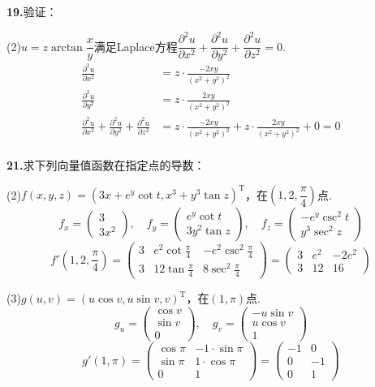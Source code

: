 \documentclass[12pt, a4paper]{article}
\begin{document}
\textbf{19.}验证：

(2)\(u = z\arctan \dfrac{x}{y}\)满足Laplace方程\(\dfrac{\partial^2 u}{\partial x^2} + \dfrac{\partial^2 u}{\partial y^2} + \dfrac{\partial^2 u}{\partial z^2} = 0\).
\begin{align*}
\frac{\partial^2 u}{\partial x^2} &= z \cdot \frac{-2xy}{(x^2 + y^2)^2} \\
\frac{\partial^2 u}{\partial y^2} &= z \cdot \frac{2xy}{(x^2 + y^2)^2} \\
\frac{\partial^2 u}{\partial x^2} + \frac{\partial^2 u}{\partial y^2} + \frac{\partial^2 u}{\partial z^2} &= z \cdot \frac{-2xy}{(x^2 + y^2)^2} + z \cdot \frac{2xy}{(x^2 + y^2)^2} + 0 = 0 \\
\end{align*}

\textbf{21.}求下列向量值函数在指定点的导数：

(2)\(f(x, y, z) = (3x + e^y \cot t, x^3 + y^3 \tan z)^\mathrm{T}\)，在\(\left(1, 2, \dfrac{\pi}{4}\right)\)点.
\[f_x = \begin{pmatrix} 3 \\ 3x^2 \end{pmatrix}, \quad f_y = \begin{pmatrix} e^y \cot t \\ 3y^2 \tan z \end{pmatrix}, \quad f_z = \begin{pmatrix} -e^y \csc^2 t \\ y^3 \sec^2 z \end{pmatrix}\]
\[f'\left(1, 2, \frac{\pi}{4}\right) = \begin{pmatrix} 3 & e^2 \cot \frac{\pi}{4} & -e^2 \csc^2 \frac{\pi}{4} \\ 3 & 12 \tan \frac{\pi}{4} & 8 \sec^2 \frac{\pi}{4} \end{pmatrix} = \begin{pmatrix} 3 & e^2 & -2e^2 \\ 3 & 12 & 16 \end{pmatrix}\]

(3)\(g(u, v) = (u \cos v, u \sin v, v)^\mathrm{T}\)，在\((1, \pi)\)点.
\[g_u = \begin{pmatrix} \cos v \\ \sin v \\ 0 \end{pmatrix}, \quad g_v = \begin{pmatrix} -u \sin v \\ u \cos v \\ 1 \end{pmatrix}\]
\[g'(1, \pi) = \begin{pmatrix} \cos \pi & -1 \cdot \sin \pi \\ \sin \pi & 1 \cdot \cos \pi \\ 0 & 1 \end{pmatrix} = \begin{pmatrix} -1 & 0 \\ 0 & -1 \\ 0 & 1 \end{pmatrix}\]
\end{document}
